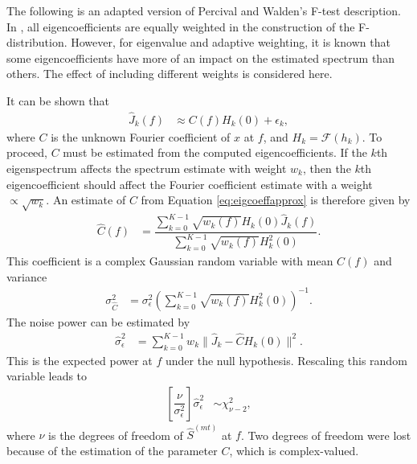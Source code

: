 The following is an adapted version of Percival and Walden's F-test description.  In \cite{percival:multitaper}, all eigencoefficients are equally weighted in the construction of the F-distribution.  However, for eigenvalue and adaptive weighting, it is known that some eigencoefficients have more of an impact on the estimated spectrum than others.  The effect of including different weights is considered here.

It can be shown that
\begin{align}
    \hat{J}_k(f) & \approx C(f) H_k(0)+\epsilon_k, \label{eq:eigcoeffapprox}
\end{align}
where $C$ is the unknown Fourier coefficient of $x$ at $f$, and $H_k=\mathcal{F}(h_k)$.  To proceed, $C$ must be estimated from the computed eigencoefficients.  If the $k$th eigenspectrum affects the spectrum estimate with weight $w_k$, then the $k$th eigencoefficient should affect the Fourier coefficient estimate with a weight $\propto\sqrt{w_k}$.  An estimate of $C$ from Equation \eqref{eq:eigcoeffapprox} is therefore given by
\begin{align}
    \hat{C}(f) & = \dfrac{\sum_{k=0}^{K-1}\sqrt{w_k(f)}H_k(0)\hat{J}_k(f)}{\sum_{k=0}^{K-1}\sqrt{w_k(f)}H^2_k(0)}.
\end{align}
This coefficient is a complex Gaussian random variable with mean $C(f)$ and variance
\begin{align}
    \sigma_{\hat{C}}^2 & = \sigma_\epsilon^2 \left(\sum_{k=0}^{K-1}\sqrt{w_k(f)}H^2_k(0)\right)^{-1}.
\end{align}
The noise power can be estimated by
\begin{align}
    \hat{\sigma}^2_\epsilon & = \sum_{k=0}^{K-1}w_k\|\hat{J}_k - \hat{C}H_k(0)\|^2. 
\end{align}
This is the expected power at $f$ under the null hypothesis.  Rescaling this random variable leads to
\begin{align}
    \left[\dfrac{\nu}{\sigma_\epsilon^2}\right]\hat{\sigma}^2_\epsilon & \sim \chi^2_{\nu-2}, \label{eq:chi1}
\end{align}
where $\nu$ is the degrees of freedom of $\hat{S}^{(mt)}$ at $f$.  Two degrees of freedom were lost because of the estimation of the parameter $C$, which is complex-valued.

